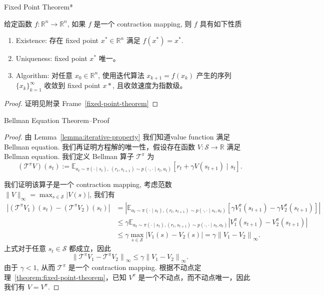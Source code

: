 \documentclass[aspectratio=169]{beamer}
\begin{document}
\begin{frame}{Fixed Point Theorem*}
    \begin{theorem}\label{theorem:fixed-point-theorem}
        给定函数 $f:\mathbb{R}^n\to\mathbb{R}^n$, 如果 $f$ 是一个 contraction mapping, 则 $f$ 具有如下性质
        \begin{enumerate}
            \item Existence: 存在 fixed point $x^*\in\mathbb{R}^n$ 满足 $f(x^*)=x^*$.
            \item Uniqueness: fixed point $x^*$ 唯一。
            \item Algorithm: 对任意 $x_0\in\mathbb{R}^n$, 使用迭代算法 $x_{k+1}=f(x_k)$ 产生的序列 $\{x_k\}_{k=1}^{\infty}$ 收敛到 fixed point $x*$, 且收敛速度为指数级。
        \end{enumerate}
    \end{theorem}
    \begin{proof}
        证明见附录 Frame~\ref{fixed-point-theorem}
    \end{proof}
\end{frame}


\begin{frame}{Bellman Equation Theorem--Proof}
    \small
    \begin{proof}
        由 Lemma~\ref{lemma:iterative-property} 我们知道value function 满足 Bellman equation.
        我们再证明方程解的唯一性，假设存在函数 $V:\mathcal{S}\to\mathbb{R}$ 满足 Bellman equation. 我们定义 Bellman 算子 $\mathcal{T}^\pi$ 为
        \begin{equation}
        (\mathcal{T}^\pi V)(s_t) := \mathbb{E}_{a_t\sim \pi(\cdot\mid s_t),\ (r_t,s_{t+1})\sim p(\cdot,\cdot\mid s_t,a_t)}\left[r_t+\gamma V(s_{t+1})\mid s_t\right].
        \end{equation}

        我们证明该算子是一个 contraction mapping, 考虑范数 $\|V\|_\infty = \max_{s\in\mathcal{S}} |V(s)|$, 我们有
        \begin{align}
        \left|(\mathcal{T}^\pi V_1)(s_t)-(\mathcal{T}^\pi V_2)(s_t)\right| &= \left|\mathbb{E}_{a_t\sim\pi(\cdot\mid s_t), (r_t,s_{t+1})\sim p(\cdot,\cdot\mid s_t,a_t)}\left[\gamma V_1^{\pi}(s_{t+1})-\gamma V_2^{\pi}(s_{t+1})\right]\right|\\
        &\leq \gamma \mathbb{E}_{a_t\sim\pi(\cdot\mid s_t), (r_t,s_{t+1})\sim p(\cdot,\cdot\mid s_t,a_t)}\left|V_1^{\pi}(s_{t+1})-V_2^{\pi}(s_{t+1})\right|\\
        &\leq \gamma \max_{s\in\mathcal{S}}\left|V_1(s)-V_2(s)\right|= \gamma \left\|V_1-V_2\right\|_\infty.
        \end{align}
        上式对于任意 $s_t\in\mathcal{S}$ 都成立，因此
        \begin{equation}
        \left\|\mathcal{T}^\pi V_1-\mathcal{T}^\pi V_2\right\|_\infty \leq \gamma \left\|V_1-V_2\right\|_\infty.
        \end{equation}
        由于 $\gamma < 1$, 从而 $\mathcal{T}^\pi$ 是一个 contraction mapping.
        根据不动点定理~\ref{theorem:fixed-point-theorem}，已知 $V^\pi$ 是一个不动点，而不动点唯一，因此我们有 $V=V^\pi$.
    \end{proof}
\end{frame}
\end{document}
